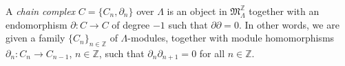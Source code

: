 A \textit{chain complex} $C = \{C_n, \partial_n\}$ over $\Lambda$ is an object in $\mathfrak{M}_\Lambda^{\mathbb{Z}}$ together with an endomorphism $\partial: C \rightarrow C$ of degree $-1$ such that $\partial \partial = 0$. In other words, we are given a family $\{C_n\}_{n \in \mathbb{Z}}$ of $\Lambda$-modules, together with module homomorphisms $\partial_n: C_n \rightarrow C_{n-1}$, $n \in \mathbb{Z}$, such that $\partial_n \partial_{n+1} = 0$ for all $n \in \mathbb{Z}$.
